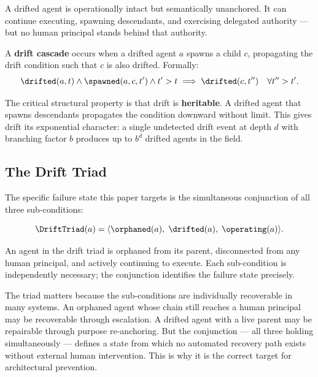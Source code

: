 A drifted agent is operationally intact but semantically unanchored. It can continue executing, spawning descendants, and exercising delegated authority — but no human principal stands behind that authority.

\begin{definition}
\label{def:drift-cascade}
A \textbf{drift cascade} occurs when a drifted agent $a$ spawns a child $c$, propagating the drift condition such that $c$ is also drifted. Formally:
\begin{equation}
\drifted(a, t) \land \spawned(a, c, t') \land t' > t \implies \drifted(c, t'') \quad \forall t'' > t'.
\label{eq:drift-cascade}
\end{equation}
\end{definition}

The critical structural property is that drift is \textbf{heritable}. A drifted agent that spawns descendants propagates the condition downward without limit. This gives drift its exponential character: a single undetected drift event at depth $d$ with branching factor $b$ produces up to $b^d$ drifted agents in the field.

\subsection{The Drift Triad}

The specific failure state this paper targets is the simultaneous conjunction of all three sub-conditions:

\begin{equation}
\DriftTriad(a) = \langle \orphaned(a),\; \drifted(a),\; \operating(a) \rangle.
\label{eq:drift-triad}
\end{equation}

An agent in the drift triad is orphaned from its parent, disconnected from any human principal, and actively continuing to execute. Each sub-condition is independently necessary; the conjunction identifies the failure state precisely.

The triad matters because the sub-conditions are individually recoverable in many systems. An orphaned agent whose chain still reaches a human principal may be recoverable through escalation. A drifted agent with a live parent may be repairable through purpose re-anchoring. But the conjunction — all three holding simultaneously — defines a state from which no automated recovery path exists without external human intervention. This is why it is the correct target for architectural prevention.


